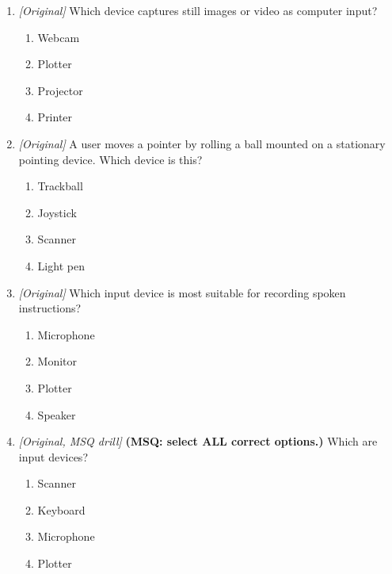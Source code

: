 \begin{enumerate}[label=\textbf{Q\arabic*.}, leftmargin=*]
\item \textit{[Original]} Which device captures still images or video as computer input?
  \begin{enumerate}[label=\Alph*.]
\item Webcam
   \item Plotter
   \item Projector
   \item Printer
  \end{enumerate}

\item \textit{[Original]} A user moves a pointer by rolling a ball mounted on a stationary pointing device. Which device is this?
  \begin{enumerate}[label=\Alph*.]
\item Trackball
   \item Joystick
   \item Scanner
   \item Light pen
  \end{enumerate}

\item \textit{[Original]} Which input device is most suitable for recording spoken instructions?
  \begin{enumerate}[label=\Alph*.]
\item Microphone
   \item Monitor
   \item Plotter
   \item Speaker
  \end{enumerate}

\item \textit{[Original, MSQ drill]} \textbf{(MSQ: select ALL correct options.)} Which are input devices?
  \begin{enumerate}[label=\Alph*.]
\item Scanner
   \item Keyboard
   \item Microphone
   \item Plotter
  \end{enumerate}

\end{enumerate}
